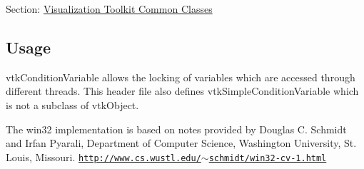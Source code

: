 Section\-: \hyperlink{sec_vtkcommon}{Visualization Toolkit Common Classes} \hypertarget{vtkwidgets_vtkxyplotwidget_Usage}{}\subsection{Usage}\label{vtkwidgets_vtkxyplotwidget_Usage}
vtk\-Condition\-Variable allows the locking of variables which are accessed through different threads. This header file also defines vtk\-Simple\-Condition\-Variable which is not a subclass of vtk\-Object.

The win32 implementation is based on notes provided by Douglas C. Schmidt and Irfan Pyarali, Department of Computer Science, Washington University, St. Louis, Missouri. \href{http://www.cs.wustl.edu/~schmidt/win32-cv-1.html}{\tt http\-://www.\-cs.\-wustl.\-edu/$\sim$schmidt/win32-\/cv-\/1.\-html}

